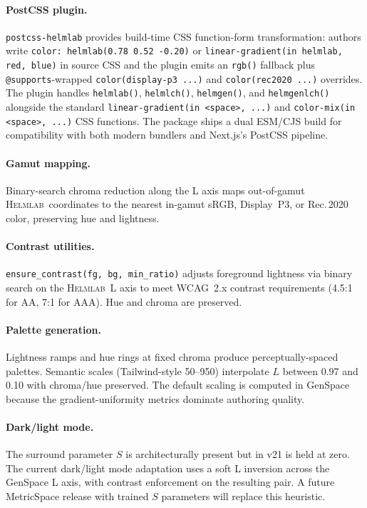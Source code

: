 \documentclass[11pt, twocolumn]{article}
\newcommand{\helmlab}{\textsc{Helmlab}}
\begin{document}
\paragraph{PostCSS plugin.}
\texttt{postcss-helmlab} provides build-time CSS
function-form transformation: authors write
\texttt{color: helmlab(0.78 0.52 -0.20)} or
\texttt{linear-gradient(in helmlab, red, blue)} in source CSS
and the plugin emits an \texttt{rgb()} fallback plus
\texttt{@supports}-wrapped \texttt{color(display-p3 ...)} and
\texttt{color(rec2020 ...)} overrides. The plugin handles
\texttt{helmlab()}, \texttt{helmlch()}, \texttt{helmgen()}, and
\texttt{helmgenlch()} alongside the standard
\texttt{linear-gradient(in <space>, ...)} and
\texttt{color-mix(in <space>, ...)} CSS functions. The package
ships a dual ESM/CJS build for compatibility with both modern
bundlers and Next.js's PostCSS pipeline.

\paragraph{Gamut mapping.}
Binary-search chroma reduction along the L axis maps out-of-gamut
\helmlab\ coordinates to the nearest in-gamut sRGB, Display~P3, or
Rec.\,2020 color, preserving hue and lightness.

\paragraph{Contrast utilities.}
\texttt{ensure\_contrast(fg, bg, min\_ratio)} adjusts foreground
lightness via binary search on the \helmlab\ L axis to meet
WCAG~2.x contrast requirements (4.5:1 for AA, 7:1 for AAA).
Hue and chroma are preserved.

\paragraph{Palette generation.}
Lightness ramps and hue rings at fixed chroma produce
perceptually-spaced palettes. Semantic scales (Tailwind-style
50--950) interpolate $L$ between 0.97 and 0.10 with chroma/hue
preserved. The default scaling is computed in GenSpace because the
gradient-uniformity metrics dominate authoring quality.

\paragraph{Dark/light mode.}
The surround parameter $S$ is architecturally present but in v21 is
held at zero. The current dark/light mode adaptation uses a soft L
inversion across the GenSpace L axis, with contrast enforcement on
the resulting pair. A future MetricSpace release with trained $S$
parameters will replace this heuristic.
\end{document}
